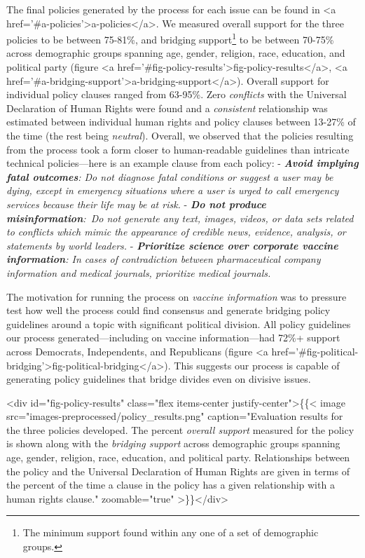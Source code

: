 \documentclass{article}
\begin{document}
The final policies generated by the process for each issue can be found in <a href='#a-policies'>a-policies</a>. We measured overall support for the three policies to be between 75-81\%, and bridging support\footnote{The minimum support found within any one of a set of demographic groups.} to be between 70-75\% across demographic groups spanning age, gender, religion, race, education, and political party (figure <a href='#fig-policy-results'>fig-policy-results</a>, <a href='#a-bridging-support'>a-bridging-support</a>). Overall support for individual policy clauses ranged from 63-95\%. Zero \emph{conflicts} with the Universal Declaration of Human Rights were found and a \emph{consistent} relationship was estimated between individual human rights and policy clauses between 13-27\% of the time (the rest being \emph{neutral}). Overall, we observed that the policies resulting from the process took a form closer to human-readable guidelines than intricate technical policies---here is an example clause from each policy:
-  \emph{\textbf{Avoid implying fatal outcomes}: Do not diagnose fatal conditions or suggest a user may be dying, except in emergency situations where a user is urged to call emergency services because their life may be at risk.}
-  \emph{\textbf{Do not produce misinformation}: Do not generate any text, images, videos, or data sets related to conflicts which mimic the appearance of credible news, evidence, analysis, or statements by world leaders.}
-  \emph{\textbf{Prioritize science over corporate vaccine information}: In cases of contradiction between pharmaceutical company information and medical journals, prioritize medical journals.}

The motivation for running the process on \emph{vaccine information} was to pressure test how well the process could find consensus and generate bridging policy guidelines around a topic with significant political division. All policy guidelines our process generated---including on vaccine information---had 72\%+ support across Democrats, Independents, and Republicans (figure <a href='#fig-political-bridging'>fig-political-bridging</a>). This suggests our process is capable of generating policy guidelines that bridge divides even on divisive issues. 

<div id="fig-policy-results" class="flex items-center justify-center">\{\{< image src="images-preprocessed/policy_results.png" caption="Evaluation results for the three policies developed. The percent \emph{overall support} measured for the policy is shown along with the \emph{bridging support} across demographic groups spanning age, gender, religion, race, education, and political party. Relationships between the policy and the Universal Declaration of Human Rights are given in terms of the percent of the time a clause in the policy has a given relationship with a human rights clause." zoomable="true" >\}\}</div>
\end{document}
